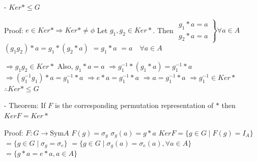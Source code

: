 - $Ker* \le G$

Proof: $e \in Ker* \Rightarrow Ker* \neq \phi$
Let $g_1, g_2 \in Ker*$. Then
$\left. \begin{matrix} g_1 * a = a \\ g_2 * a = a \end{matrix} \right\} \forall a \in A$
$(g_1 g_2) * a = g_1 * (g_2 * a)$
$= g_1 * a$
$= a \quad \forall a \in A$

$\Rightarrow g_1 g_2 \in Ker*$
Also, $g_1 * a = a$
$\Rightarrow g_1^{-1} * (g_1 * a) = g_1^{-1} * a$
$\Rightarrow (g_1^{-1} g_1) * a = g_1^{-1} * a$
$\Rightarrow e * a = g_1^{-1} * a$
$\Rightarrow a = g_1^{-1} * a$
$\Rightarrow g_1^{-1} \in Ker*$
$\therefore Ker* \le G$

- Theorem: If $F$ is the corresponding permutation representation of $*$ then $Ker F = Ker *$

Proof: $F: G \to \text{Sym} A$
$F(g) = \sigma_g$
$\sigma_g(a) = g * a$
$Ker F = \{g \in G \mid F(g) = I_A\}$
$= \{g \in G \mid \sigma_g = \sigma_e\}$
$= \{g \in G \mid \sigma_g(a) = \sigma_e(a), \forall a \in A\}$
$= \{g * a = e * a, a \in A\}$
